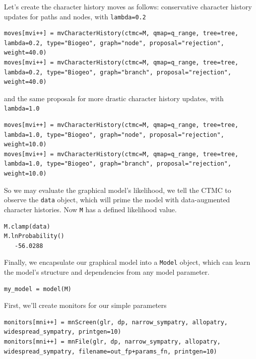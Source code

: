 Let's create the character history moves as follows: conservative character history updates for paths and nodes, with {\tt lambda=0.2}

\begin{snugshade}
\begin{lstlisting}
moves[mvi++] = mvCharacterHistory(ctmc=M, qmap=q_range, tree=tree, lambda=0.2, type="Biogeo", graph="node", proposal="rejection", weight=40.0)
moves[mvi++] = mvCharacterHistory(ctmc=M, qmap=q_range, tree=tree, lambda=0.2, type="Biogeo", graph="branch", proposal="rejection", weight=40.0)
\end{lstlisting}
\end{snugshade}

and the same proposals for more drastic character history updates, with {\tt lambda=1.0}

\begin{snugshade}
\begin{lstlisting}
moves[mvi++] = mvCharacterHistory(ctmc=M, qmap=q_range, tree=tree, lambda=1.0, type="Biogeo", graph="node", proposal="rejection", weight=10.0)
moves[mvi++] = mvCharacterHistory(ctmc=M, qmap=q_range, tree=tree, lambda=1.0, type="Biogeo", graph="branch", proposal="rejection", weight=10.0)
\end{lstlisting}
\end{snugshade}

So we may evaluate the graphical model's likelihood, we tell the CTMC to observe the {\tt data} object, which will prime the model with data-augmented character histories.
Now {\tt M} has a defined likelihood value.
\begin{snugshade}
\begin{lstlisting}
M.clamp(data)
M.lnProbability()
   -56.0288
\end{lstlisting}
\end{snugshade}

Finally, we encapsulate our graphical model into a {\tt Model} object, which can learn the model's structure and dependencies from any model parameter.
\begin{snugshade}
\begin{lstlisting}
my_model = model(M)
\end{lstlisting}
\end{snugshade}

First, we'll create monitors for our simple parameters

\begin{snugshade}
\begin{lstlisting}
monitors[mni++] = mnScreen(glr, dp, narrow_sympatry, allopatry, widespread_sympatry, printgen=10)
monitors[mni++] = mnFile(glr, dp, narrow_sympatry, allopatry, widespread_sympatry, filename=out_fp+params_fn, printgen=10)
\end{lstlisting}
\end{snugshade}


